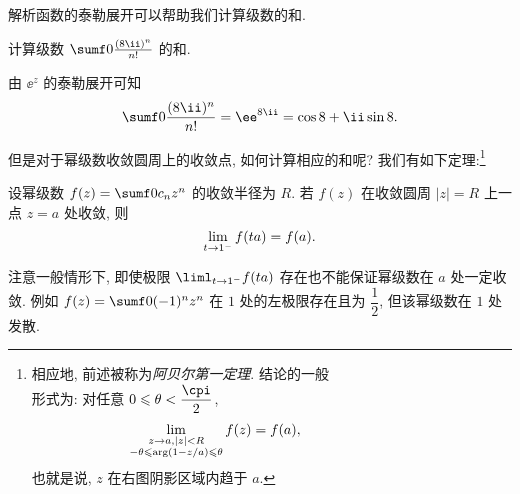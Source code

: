 解析函数的泰勒展开可以帮助我们计算级数的和.

\begin{example}
  计算级数 $\sumf0 \frac{(8\ii)^n}{n!}$ 的和.
\end{example}

\begin{solution}
  由 $\ee^z$ 的泰勒展开可知
  \[
     \sumf0 \frac{(8\ii)^n}{n!}
    =\ee^{8\ii}
    =\cos 8+\ii \sin 8.
  \]
\end{solution}

但是对于幂级数收敛圆周上的收敛点, 如何计算相应的和呢?
我们有如下定理:\footnote{%
  相应地, 前述\thmAF 被称为\emph{阿贝尔第一定理}. \thmAS 结论的一般\\
  形式为: 对任意 $0\le \theta<\dfrac\cpi2$,
  \begin{align*}
    \lim_{\substack{z\rightarrow a,|z|<R\\-\theta\leqslant\arg (1-z/a)\leqslant\theta}}f(z)=f(a),\qquad\qquad\qquad&&&
  \end{align*}
  也就是说, $z$ 在右图阴影区域内趋于 $a$.
}

\begin{theorem}[阿贝尔第二定理]
  \label{thm:abel-second}
  设幂级数 $f(z)=\sumf0 c_nz^n$ 的收敛半径为 $R$.
  若 $f(z)$ 在收敛圆周 $|z|=R$ 上一点 $z=a$ 处收敛, 则
  \[
    \lim_{t\rightarrow 1^-}f(ta)=f(a).
  \]
\end{theorem}

注意一般情形下, 即使极限 $\liml_{t\ra 1^-}f(ta)$ 存在也不能保证幂级数在 $a$ 处一定收敛.
例如 $f(z)=\sumf0 (-1)^nz^n$ 在 $1$ 处的左极限存在且为 $\dfrac12$, 但该幂级数在 $1$ 处发散.


